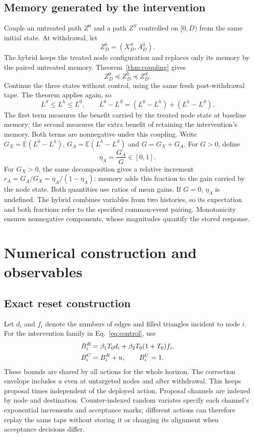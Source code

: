 \documentclass[final,5p,times,twocolumn,sort&compress]{elsarticle}
\theoremstyle{plain}
\newcommand{\E}{\mathbb{E}}
\begin{document}
\subsection{Memory generated by the intervention}
Couple an untreated path $Z^0$ and a path $Z^S$ controlled on $[0,D)$ from the same initial state. At withdrawal, let
\[
 Z^{h}_D=(X^S_D,A^0_D).
\]
The hybrid keeps the treated node configuration and replaces only its memory by the paired untreated memory. Theorem~\ref{thm:coupling} gives
\[
 Z^0_D\preceq Z^{h}_D\preceq Z^S_D.
\]
Continue the three states without control, using the same fresh post-withdrawal tape. The theorem applies again, so
\begin{equation}
 L^S\le L^{h}\le L^0,\qquad
 L^0-L^S=(L^0-L^{h})+(L^{h}-L^S).\label{eq:withdrawal_decomposition}
\end{equation}
The first term measures the benefit carried by the treated node state at baseline memory; the second measures the extra benefit of retaining the intervention's memory. Both terms are nonnegative under this coupling. Write $G_X=\E(L^0-L^{h})$, $G_A=\E(L^{h}-L^S)$ and $G=G_X+G_A$. For $G>0$, define
\begin{equation}
 \eta_A=\frac{G_A}{G}\in[0,1].\label{eq:memory_fraction}
\end{equation}
For $G_X>0$, the same decomposition gives a relative increment $r_A=G_A/G_X=\eta_A/(1-\eta_A)$: memory adds this fraction to the gain carried by the node state. Both quantities use ratios of mean gains. If $G=0$, $\eta_A$ is undefined. The hybrid combines variables from two histories, so its expectation and both fractions refer to the specified common-event pairing. Monotonicity ensures nonnegative components, whose magnitudes quantify the stored response.

\section{Numerical construction and observables}
\label{sec:simulation}
\subsection{Exact reset construction}
Let $d_i$ and $f_i$ denote the numbers of edges and filled triangles incident to node $i$. For the intervention family in Eq.~\ref{eq:control}, use
\begin{align}
 B_i^R&=\beta_1T_0d_i+\beta_2T_0(1+T_0)f_i,\notag\\
 B_i^C&=B_i^R+u,\qquad B_i^U=1.\label{eq:bounds}
\end{align}
These bounds are shared by all actions for the whole horizon. The correction envelope includes $u$ even at untargeted nodes and after withdrawal. This keeps proposal times independent of the deployed action. Proposal channels are indexed by node and destination. Counter-indexed random variates specify each channel's exponential increments and acceptance marks; different actions can therefore replay the same tape without storing it or changing its alignment when acceptance decisions differ.
\end{document}
